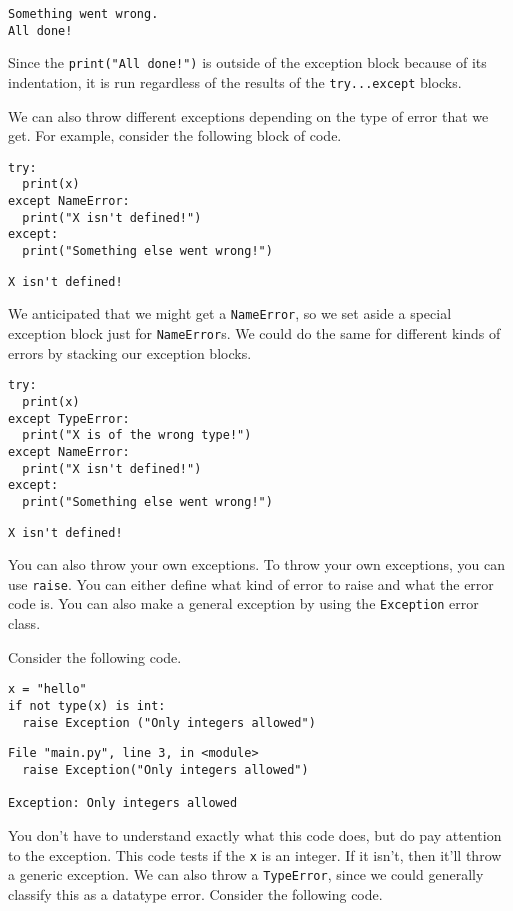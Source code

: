 \begin{lstlisting}
Something went wrong.
All done!
\end{lstlisting}
Since the \verb|print("All done!")| is outside of the exception block because of its indentation, it is run regardless of the results of the \verb|try...except| blocks.\par
We can also throw different exceptions depending on the type of error that we get. For example, consider the following block of code.
\begin{lstlisting}[style=pippython]
try:
  print(x)
except NameError:
  print("X isn't defined!")
except:
  print("Something else went wrong!")
\end{lstlisting}
\begin{lstlisting}[style=none]
X isn't defined!
\end{lstlisting}
We anticipated that we might get a \verb|NameError|, so we set aside a special exception block just for \verb|NameError|s. We could do the same for different kinds of errors by stacking our exception blocks.\par
\begin{lstlisting}[style=pippython]
try:
  print(x)
except TypeError:
  print("X is of the wrong type!")
except NameError:
  print("X isn't defined!")
except:
  print("Something else went wrong!")
\end{lstlisting}
\begin{lstlisting}[style=none]
X isn't defined!
\end{lstlisting}
You can also throw your own exceptions. To throw your own exceptions, you can use \verb|raise|. You can either define what kind of error to raise and what the error code is. You can also make a general exception by using the \verb|Exception| error class.\par
Consider the following code.
\begin{lstlisting}[style=pippython]
x = "hello"
if not type(x) is int:
  raise Exception ("Only integers allowed")
\end{lstlisting}
\begin{lstlisting}[style=none]
File "main.py", line 3, in <module>
  raise Exception("Only integers allowed")
  
Exception: Only integers allowed
\end{lstlisting}
You don't have to understand exactly what this code does, but do pay attention to the exception. This code tests if the  \verb|x| is an integer. If it isn't, then it'll throw a generic exception. We can also throw a \verb|TypeError|, since we could generally classify this as a datatype error. Consider the following code.\par
